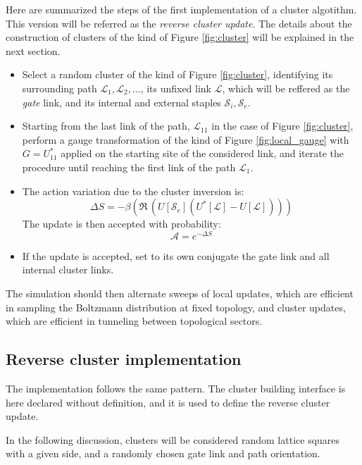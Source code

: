 Here are summarized the steps of the first implementation of a cluster algotithm.
This version will be referred as the \emph{reverse cluster update}.
The details about the construction of clusters of the kind of Figure \ref{fig:cluster}
will be explained in the next section.

\begin{itemize}
    \item
        Select a random cluster of the kind of Figure \ref{fig:cluster},
        identifying its surrounding path $\mathcal L_1, \mathcal L_2, \ldots$,
        its unfixed link $\mathcal L$, which will be reffered as the \emph{gate} link,
        and its internal and external staples $\mathcal S_i, \mathcal S_e$.
    \item 
        Starting from the last link of the path,
        $\mathcal L_{11}$ in the case of Figure \ref{fig:cluster},
        perform a gauge transformation of the kind of Figure \ref{fig:local_gauge}
        with $G=U^*_{11}$ applied on the starting site of the considered link,
        and iterate the procedure until reaching the first link of the path $\mathcal L_1$.
    \item
        The action variation due to the cluster inversion is:
        \[
            \Delta S = -\beta(\Re\,(U[\mathcal S_e](U^*[\mathcal L]-U[\mathcal L])))
        \]
        The update is then accepted with probability:
        \[
            \mathcal A = e^{-\Delta S}
        \]
    \item 
        If the update is accepted,
        set to its own conjugate the gate link and all internal cluster links.
\end{itemize}

The simulation should then alternate sweeps of local updates,
which are efficient in sampling the Boltzmann distribution at fixed topology,
and cluster updates, which are efficient in tunneling between topological sectors.

\subsection{Reverse cluster implementation}
The implementation follows the same pattern.
The cluster building interface is here declared without definition,
and it is used to define the reverse cluster update.

In the following discussion,
clusters will be considered random lattice squares with a given side,
and a randomly chosen gate link and path orientation.

